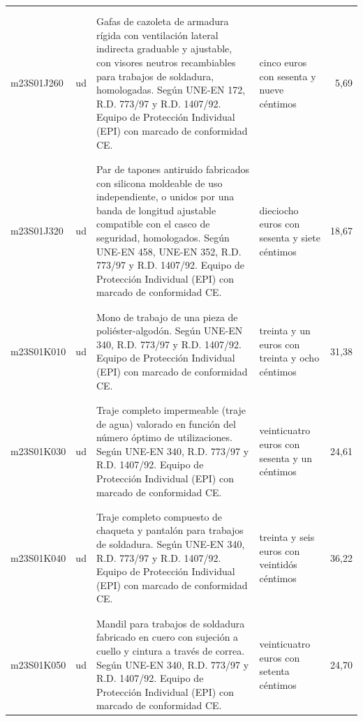 \begin{supertabular}{|l|l|p{5cm}|p{3cm}|r|}
&&&&\\%
&&&&\\%
m23S01J260&ud&Gafas de cazoleta de armadura rígida con ventilación lateral indirecta graduable y ajustable, con visores neutros recambiables para trabajos de soldadura, homologadas. Según UNE{-}EN 172, R.D. 773/97 y R.D. 1407/92. Equipo de Protección Individual (EPI) con marcado de conformidad CE.&cinco euros con sesenta y nueve céntimos&5,69\\%
&&&&\\%
&&&&\\%
m23S01J320&ud&Par de tapones antiruido fabricados con silicona moldeable de uso independiente, o unidos por una banda de longitud ajustable compatible con el casco de seguridad, homologados. Según UNE{-}EN 458, UNE{-}EN 352, R.D. 773/97 y R.D. 1407/92. Equipo de Protección Individual (EPI) con marcado de conformidad CE.&dieciocho euros con sesenta y siete céntimos&18,67\\%
&&&&\\%
&&&&\\%
m23S01K010&ud&Mono de trabajo de una pieza de poliéster{-}algodón. Según UNE{-}EN 340, R.D. 773/97 y R.D. 1407/92. Equipo de Protección Individual (EPI) con marcado de conformidad CE.&treinta y un euros con treinta y ocho céntimos&31,38\\%
&&&&\\%
&&&&\\%
m23S01K030&ud&Traje completo impermeable (traje de agua) valorado en función del número óptimo de utilizaciones. Según UNE{-}EN 340, R.D. 773/97 y R.D. 1407/92. Equipo de Protección Individual (EPI) con marcado de conformidad CE.&veinticuatro euros con sesenta y un céntimos&24,61\\%
&&&&\\%
&&&&\\%
m23S01K040&ud&Traje completo compuesto de chaqueta y pantalón para trabajos de soldadura. Según UNE{-}EN 340, R.D. 773/97 y R.D. 1407/92. Equipo de Protección Individual (EPI) con marcado de conformidad CE.&treinta y seis euros con veintidós céntimos&36,22\\%
&&&&\\%
&&&&\\%
m23S01K050&ud&Mandil para trabajos de soldadura fabricado en cuero con sujeción a cuello y cintura a través de correa. Según UNE{-}EN 340, R.D. 773/97 y R.D. 1407/92. Equipo de Protección Individual (EPI) con marcado de conformidad CE.&veinticuatro euros con setenta céntimos&24,70\\%

\end{supertabular}
